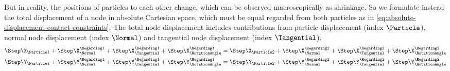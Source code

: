 But in reality, the positions of particles to each other change, which can be observed macroscopically as shrinkage.
So we formulate instead the total displacement of a node in absolute Cartesian space, which must be equal regarded from both particles as in \cref{eq:absolute-displacement-contact-constraints}.
The total node displacement includes contributions from particle displacement (index $\Particle$), normal node displacement (index $\Normal$) and tangential node displacement (index $\Tangential$).
\begin{subequations}
    \begin{align}
        \Step\X_{\Particle1} + \Step\X_{\Normal}^{\Regarding1} + \Step\X_{\Tangential}^{\Regarding1} + \Step\X_{\RotationAngle}^{\Regarding1}
        &= \Step\X_{\Particle2} + \Step\X_{\Normal}^{\Regarding2} + \Step\X_{\Tangential}^{\Regarding2} + \Step\X_{\RotationAngle}^{\Regarding2}\\
        \Step\Y_{\Particle1} + \Step\Y_{\Normal}^{\Regarding1} + \Step\Y_{\Tangential}^{\Regarding1} + \Step\Y_{\RotationAngle}^{\Regarding1}
        &= \Step\Y_{\Particle2} + \Step\Y_{\Normal}^{\Regarding2} + \Step\Y_{\Tangential}^{\Regarding2} + \Step\Y_{\RotationAngle}^{\Regarding2}
        \label{eq:absolute-displacement-contact-constraints}
    \end{align}
\end{subequations}


